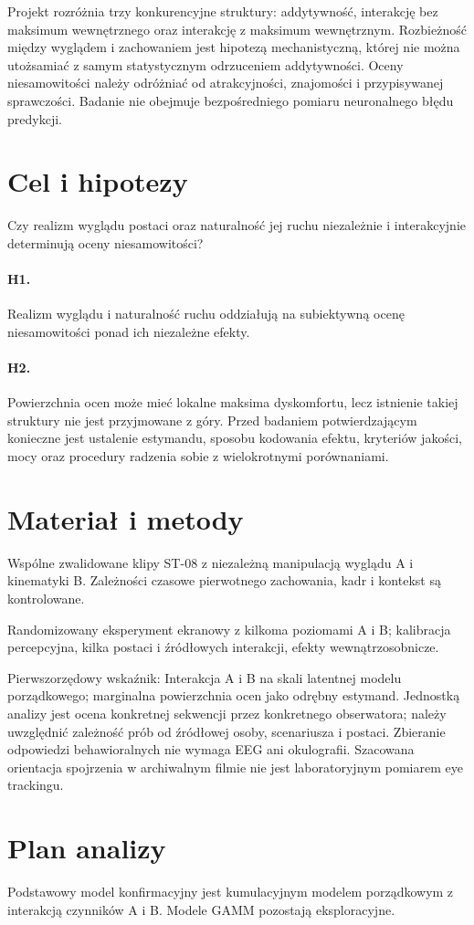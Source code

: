 \documentclass[11pt,a4paper]{article}
\begin{document}
Projekt rozróżnia trzy konkurencyjne struktury: addytywność, interakcję bez maksimum wewnętrznego oraz interakcję z maksimum wewnętrznym. Rozbieżność między wyglądem i zachowaniem jest hipotezą mechanistyczną, której nie można utożsamiać z samym statystycznym odrzuceniem addytywności. Oceny niesamowitości należy odróżniać od atrakcyjności, znajomości i przypisywanej sprawczości. Badanie nie obejmuje bezpośredniego pomiaru neuronalnego błędu predykcji.

\section{Cel i hipotezy}
Czy realizm wyglądu postaci oraz naturalność jej ruchu niezależnie i interakcyjnie determinują oceny niesamowitości?
\paragraph{H1.} Realizm wyglądu i naturalność ruchu oddziałują na subiektywną ocenę niesamowitości ponad ich niezależne efekty.
\paragraph{H2.} Powierzchnia ocen może mieć lokalne maksima dyskomfortu, lecz istnienie takiej struktury nie jest przyjmowane z góry.
Przed badaniem potwierdzającym konieczne jest ustalenie estymandu, sposobu kodowania efektu, kryteriów jakości, mocy oraz procedury radzenia sobie z wielokrotnymi porównaniami.
\section{Materiał i metody}
Wspólne zwalidowane klipy ST-08 z niezależną manipulacją wyglądu A i kinematyki B. Zależności czasowe pierwotnego zachowania, kadr i kontekst są kontrolowane.

Randomizowany eksperyment ekranowy z kilkoma poziomami A i B; kalibracja percepcyjna, kilka postaci i źródłowych interakcji, efekty wewnątrzosobnicze.

Pierwszorzędowy wskaźnik: Interakcja A i B na skali latentnej modelu porządkowego; marginalna powierzchnia ocen jako odrębny estymand. Jednostką analizy jest ocena konkretnej sekwencji przez konkretnego obserwatora; należy uwzględnić zależność prób od źródłowej osoby, scenariusza i postaci. Zbieranie odpowiedzi behawioralnych nie wymaga EEG ani okulografii. Szacowana orientacja spojrzenia w archiwalnym filmie nie jest laboratoryjnym pomiarem eye trackingu.
\section{Plan analizy}
Podstawowy model konfirmacyjny jest kumulacyjnym modelem porządkowym z interakcją czynników A i B. Modele GAMM pozostają eksploracyjne.
\end{document}
